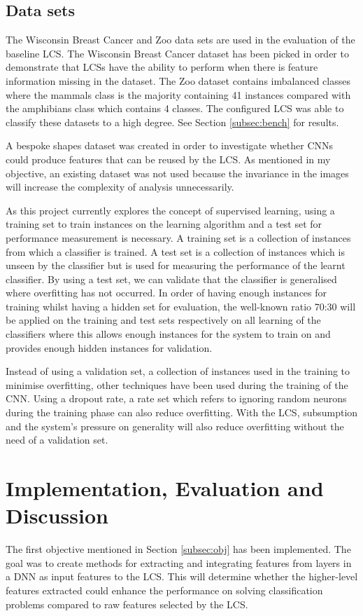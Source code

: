 \section{Data sets} \label{subsec:datasets}
The Wisconsin Breast Cancer \cite{wisconsinbreast} and Zoo \cite{zoodata} data sets are used in the evaluation of the baseline LCS. The Wisconsin Breast Cancer dataset has been picked in order to demonstrate that LCSs have the ability to perform when there is feature information missing in the dataset. The Zoo dataset contains imbalanced classes where the mammals class is the majority containing 41 instances compared with the amphibians class which contains 4 classes. The configured LCS was able to classify these datasets to a high degree. See Section \ref{subsec:bench} for results. 

A bespoke shapes dataset was created in order to investigate whether CNNs could produce features that can be reused by the LCS. As mentioned in my objective, an existing dataset was not used because the invariance in the images will increase the complexity of analysis unnecessarily. 

As this project currently explores the concept of supervised learning, using a training set to train instances on the learning algorithm and a test set for performance measurement is necessary. A training set is a collection of instances from which a classifier is trained. A test set is a collection of instances which is unseen by the classifier but is used for measuring the performance of the learnt classifier. By using a test set, we can validate that the classifier is generalised where overfitting has not occurred. In order of having enough instances for training whilst having a hidden set for evaluation, the well-known ratio 70:30 will be applied on the training and test sets respectively on all learning of the classifiers where this allows enough instances for the system to train on and provides enough hidden instances for validation.

Instead of using a validation set, a collection of instances used in the training to minimise overfitting, other techniques have been used during the training of the CNN. Using a dropout rate, a rate set which refers to ignoring random neurons during the training phase can also reduce overfitting. With the LCS, subsumption and the system’s pressure on generality will also reduce overfitting without the need of a validation set.

\chapter{Implementation, Evaluation and Discussion}
The first objective mentioned in Section \ref{subsec:obj} has been implemented. The goal was to create methods for extracting and integrating features from layers in a DNN as input features to the LCS. This will determine whether the higher-level features extracted could enhance the performance on solving classification problems compared to raw features selected by the LCS. 

